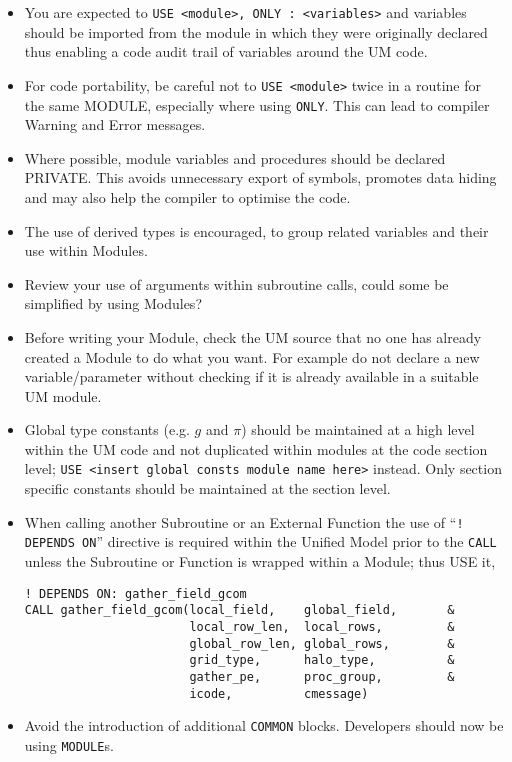 \begin{itemize}
\item You are expected to \verb|USE <module>, ONLY : <variables>| and variables
should be imported from the module in which they were originally declared thus
enabling a code audit trail of variables around the UM code.
\item For code portability, be careful not to \verb|USE <module>| twice in a routine
for the same MODULE, especially where using \verb|ONLY|.
This can lead to compiler Warning and Error messages.
\item Where possible, module variables and procedures should be declared
PRIVATE. This avoids unnecessary export of symbols,
promotes data hiding and may also help the compiler to optimise the code.
\item The use of derived types is encouraged, to group related variables and their
use within Modules.
\item Review your use of arguments within subroutine calls,
could some be simplified by using Modules?
\item Before writing your Module, check the UM source that no one has already created a Module to do what you want. For example
do not declare a new variable/parameter without checking if it is already available in a suitable UM module.
\item Global type constants (e.g. $g$ and $\pi$) should be maintained at a high level
within the UM code and not duplicated within modules at the code section level;
\verb|USE <insert global consts module name here>| instead.
Only section specific constants should be maintained at the section level.
\item When calling another Subroutine or an External Function the use of ``\verb|! DEPENDS ON|'' directive
is required within the Unified Model prior to the \verb|CALL| unless the
Subroutine or Function is wrapped within a Module; thus USE it,
\begin{verbatim}
! DEPENDS ON: gather_field_gcom
CALL gather_field_gcom(local_field,    global_field,       &
                       local_row_len,  local_rows,         &
                       global_row_len, global_rows,        &
                       grid_type,      halo_type,          &
                       gather_pe,      proc_group,         &
                       icode,          cmessage)
\end{verbatim}
\item Avoid the introduction of additional \verb|COMMON| blocks.
      Developers should now be using \verb|MODULE|s.
\end{itemize}


